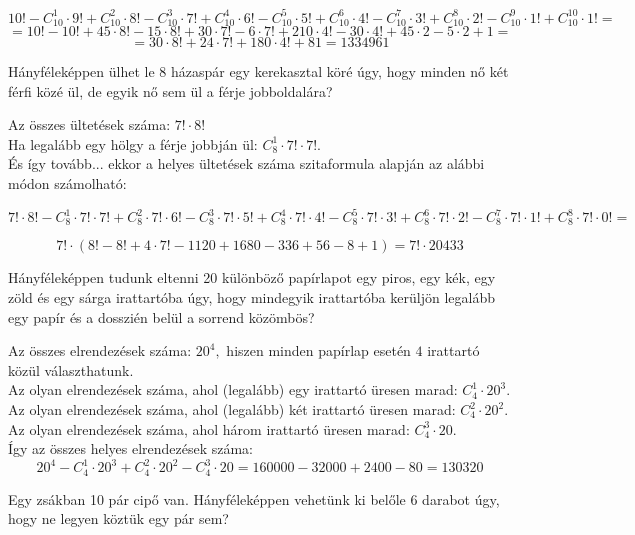\begin{solution}
\[
10!-C_{10}^{1}\cdot9!+C_{10}^{2}\cdot8!-C_{10}^{3}\cdot7!+C_{10}^{4}\cdot6!-C_{10}^{5}\cdot5!+C_{10}^{6}\cdot4!-C_{10}^{7}\cdot3!+C_{10}^{8}\cdot2!-C_{10}^{9}\cdot1!+C_{10}^{10}\cdot1!=
\]
\[
=10!-10!+45\cdot8!-15\cdot8!+30\cdot7!-6\cdot7!+210\cdot4!-30\cdot4!+45\cdot2-5\cdot2+1=
\]
\[
=30\cdot8!+24\cdot7!+180\cdot4!+81=1334961
\]
\end{solution}
\begin{problem}
Hányféleképpen ülhet le 8 házaspár egy kerekasztal köré úgy, hogy
minden nő két férfi közé ül, de egyik nő sem ül a férje jobboldalára?\\
 
\end{problem}

\begin{solution}
Az összes ültetések száma: $7!\cdot8!$\\

Ha legalább egy hölgy a férje jobbján ül: $C_{8}^{1}\cdot7!\cdot7!.$\\

És így tovább... ekkor a helyes ültetések száma szitaformula alapján
az alábbi módon számolható:

\[
7!\cdot8!-C_{8}^{1}\cdot7!\cdot7!+C_{8}^{2}\cdot7!\cdot6!-C_{8}^{3}\cdot7!\cdot5!+C_{8}^{4}\cdot7!\cdot4!-C_{8}^{5}\cdot7!\cdot3!+C_{8}^{6}\cdot7!\cdot2!-C_{8}^{7}\cdot7!\cdot1!+C_{8}^{8}\cdot7!\cdot0!=
\]

\[
7!\cdot(8!-8!+4\cdot7!-1120+1680-336+56-8+1)=7!\cdot20433
\]
\end{solution}
\begin{problem}
Hányféleképpen tudunk eltenni 20 különböző papírlapot egy piros, egy
kék, egy zöld és egy sárga irattartóba úgy, hogy mindegyik irattartóba
kerüljön legalább egy papír és a dosszién belül a sorrend közömbös?
\end{problem}

\begin{solution}
Az összes elrendezések száma: $20^{4},$ hiszen minden papírlap esetén
$4$ irattartó közül választhatunk.\\
 Az olyan elrendezések száma, ahol (legalább) egy irattartó üresen
marad: $C_{4}^{1}\cdot20^{3}.$\\
 Az olyan elrendezések száma, ahol (legalább) két irattartó üresen
marad: $C_{4}^{2}\cdot20^{2}.$\\
 Az olyan elrendezések száma, ahol három irattartó üresen marad: $C_{4}^{3}\cdot20.$\\

Így az összes helyes elrendezések száma: 
\[
20^{4}-C_{4}^{1}\cdot20^{3}+C_{4}^{2}\cdot20^{2}-C_{4}^{3}\cdot20=160000-32000+2400-80=130320
\]
\end{solution}
\begin{problem}
Egy zsákban 10 pár cipő van. Hányféleképpen vehetünk ki belőle 6 darabot
úgy, hogy ne legyen köztük egy pár sem?\\
\end{problem}

